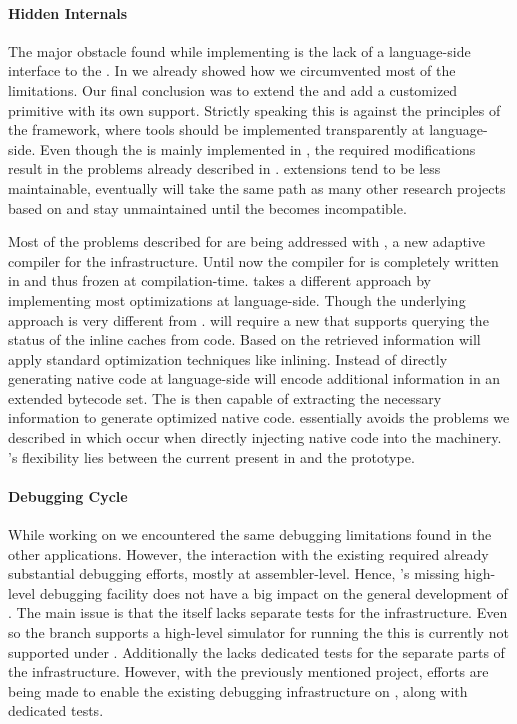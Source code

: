 \paragraph{Hidden \VM Internals}
The major obstacle found while implementing \NBJ is the lack of a language-side interface to the \JIT.
In  we already showed how we circumvented most of the limitations.
Our final conclusion was to extend the \VM and add a customized primitive with its own \JIT support.
Strictly speaking this is against the principles of the \B framework, where tools should be implemented transparently at language-side.
Even though the \NBJ is mainly implemented in \PH, the required \VM modifications result in the problems already described in .
\VM extensions tend to be less maintainable, eventually \NBJ will take the same path as many other research \VM projects based on \PH and stay unmaintained until the \VM becomes incompatible.

Most of the problems described for \NBJ are being addressed with \Sista, a new adaptive \JIT compiler for the \Cog infrastructure. 
Until now the \JIT compiler for \Cog is completely written in \Slang and thus frozen at \VM compilation-time.
\Sista takes a different approach by implementing most \JIT optimizations at language-side.
Though the underlying approach is very different from \NBJ.
\Sista will require a new \VM that supports querying the status of the inline caches from \PH code.
Based on the retrieved information \Sista will apply standard optimization techniques like inlining.
Instead of directly generating native code at language-side \Sista will encode additional information in an extended bytecode set.
The \VM is then capable of extracting the necessary information to generate optimized native code.
\Sista essentially avoids the problems we described in  which occur when directly injecting native code into the \JIT machinery.
\Sista's flexibility lies between the current \JIT present in \Cog and the \NBJ prototype.

\paragraph{Debugging Cycle}
While working on \NBJ we encountered the same debugging limitations found in the other \B applications.
However, the interaction with the existing \JIT required already substantial debugging efforts, mostly at assembler-level.
Hence, \B's missing high-level debugging facility does not have a big impact on the general development of \NBJ.
The main issue is that the \VM itself lacks separate tests for the \JIT infrastructure.
Even so the \Cog branch supports a high-level simulator for running the \JIT this is currently not supported under \PH.
Additionally the \VM lacks dedicated tests for the separate parts of the \JIT infrastructure.
However, with the previously mentioned \Sista project, efforts are being made to enable the existing \VM debugging infrastructure on \PH, along with dedicated tests.

